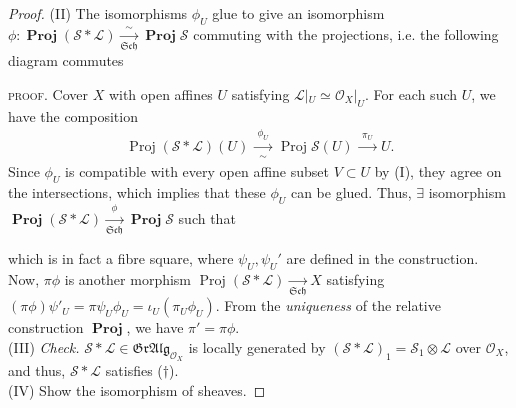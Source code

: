 \documentclass[11pt,a4paper,footinclude=true,headinclude=true]{scrbook} %
\newcommand{\acton}{\rotatebox{180}{$\,\circlearrowright$}}
\DeclareMathOperator{\Proj}{Proj}
\DeclareMathOperator{\PROJ}{\mathbf{Proj}}
\newcommand{\LL}{\mathscr{L}}
\newcommand{\OO}{\mathcal{O}}
\newcommand{\Ss}{\mathscr{S}}
\newcommand{\Sch}{\mathfrak{Sch}}
\newcommand{\<}{\langle}
\newcommand{\>}{\rangle}
\newcommand{\GR}{\mathfrak{Gr}}
\newcommand{\ALG}{\mathfrak{Alg}}
\newcommand\Comm[2][\acton]{%
  \arrow[mysymbol]{#2}[description]{#1}}
\begin{document}
\begin{proof}
    (II) The isomorphisms $\phi_U$ glue to give an isomorphism $\phi:\PROJ(\Ss\ast\LL)\xrightarrow[\Sch]{\sim}\PROJ\Ss$ commuting with the projections, i.e. the following diagram commutes
    \begin{center}
    \end{center}
    \textsc{proof.} Cover $X$ with open affines $U$ satisfying $\LL|_U\simeq\OO_X|_U$. For each such $U$, we have the composition
    \begin{align*}
        \Proj(\Ss\ast\LL)(U)\xrightarrow[\sim]{~~\phi_U~~}\Proj\Ss(U)\xrightarrow[]{~~\pi_U~~}U.
    \end{align*}
    Since $\phi_U$ is compatible with every open affine subset $V\subset U$ by (I), they agree on the intersections, which implies that these $\phi_U$ can be glued. Thus, $\exists$ isomorphism $\PROJ(\Ss\ast\LL)\xrightarrow[\Sch]{\phi}\PROJ\Ss$ such that
    \begin{center}
    \end{center}
    which is in fact a fibre square, where $\psi_U,\psi_U'$ are defined in the construction. Now, $\pi\phi$ is another morphism $\Proj(\Ss\ast\LL)\xrightarrow[\Sch]{}X$ satisfying $(\pi\phi)\psi'_U=\pi\psi_U\phi_U=\iota_U(\pi_U\phi_U)$. From the \textit{uniqueness} of the relative construction $\PROJ$, we have $\pi'=\pi\phi$.\\
    
    (III) \textit{Check.} $\Ss\ast\LL\in\GR\ALG_{\OO_X}$ is locally generated by $(\Ss\ast\LL)_1=\Ss_1\otimes\LL$ over $\OO_X$, and thus, $\Ss\ast\LL$ satisfies ($\dagger$).\\
    
    (IV) Show the isomorphism of sheaves.
    

\end{proof}
\end{document}
